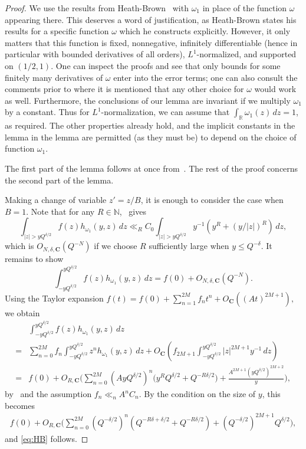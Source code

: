 \documentclass[letterpaper,11pt]{amsart}
\numberwithin{equation}{section}
\theoremstyle{definition}
\numberwithin{equation}{section}
\newcommand{\N}{\mathbb{N}}
\newcommand{\R}{\mathbb{R}}
\begin{document}
\begin{proof}
    We use the results from Heath-Brown~\cite[Section~4]{Heath-Brown96} with $\omega_1$ in place of the function $\omega$ appearing there. This deserves a word of justification, as Heath-Brown states his results for a specific function $\omega$ which he constructs explicitly. However, it only matters that this function is fixed, nonnegative, infinitely differentiable (hence in particular with bounded derivatives of all orders), $L^1$-normalized, and supported on $(1/2,1)$. One can inspect the proofs and see that only bounds for some finitely many derivatives of $\omega$ enter into the error terms; one can also consult the comments prior to \cite[Lemma 6]{Heath-Brown96} where it is mentioned that any other choice for $\omega$ would work as well. Furthermore, the conclusions of our lemma are invariant if we multiply $\omega_1$ by a constant. Thus for $L^1$-normalization, we can assume that \(\int_{\R}\omega_1(z)\,dz=1\), as required. The other properties already hold, and the implicit constants in the lemma in the lemma are permitted (as they must be) to depend on the choice of function $\omega_1$.

    The first part of the lemma follows at once from~\cite[Lemma 4]{Heath-Brown96}. The rest of the proof concerns the second part of the lemma.
    
	Making a change of variable \(z'=z/B\), it is enough to consider the case when \(B=1\).
	Note that for  any \(R\in\N\),~\cite[Lemma 5]{Heath-Brown96} gives
	\[
	\int_{|z|>yQ^{\delta/2}}
	f(z)h_{\omega_1}(y,z)\,dz
	\ll_R
	C_0
	\int_{|z|>yQ^{\delta/2}}
	y^{-1}(y^R+(y/|z|)^R)\,dz,
	\]
	which is \(O_{N,\delta,\boldsymbol{C}}(Q^{-N})\) if we choose \(R\) sufficiently large when $y\leq Q^{-\delta}$. It remains to show
	\begin{equation}\label{eq:HB}
\int_{-yQ^{\delta/2}}^{yQ^{\delta/2}}
	f(z)h_{\omega_1}(y,z)\,dz
	=	f(0)	+O_{N, \delta, \boldsymbol{C}} ( Q^{-N}).
	\end{equation}
	Using the Taylor expansion 
	\(
	f(t) = f(0)+\sum_{n=1}^{2M} f_n t^n+O_{\boldsymbol{C}}  (
	(At)^{2M+1}
	),
	\)
	we obtain
	\begin{align*}
&\int_{-yQ^{\delta/2}}^{yQ^{\delta/2}}
	f(z)h_{\omega_1}(y,z)\,dz
	\\=&
	\sum_{n=0}^{2M}
	f_n\int_{-yQ^{\delta/2}}^{yQ^{\delta/2}}
	z^n
	h_{\omega_1}(y,z)\,dz
	+O_{ \boldsymbol{C}}  \left( f_{2M+1}
	\int_{-yQ^{\delta/2}}^{yQ^{\delta/2}}
	|z|^{2M+1}
	y^{-1}\,dz\right)
	\\
	=
	{}&
	f(0)+O_{ R,\boldsymbol{C}} \bigg(
	\sum_{n=0}^{2M}
	(AyQ^{\delta/2})^n
	\big(
	y^RQ^{\delta/2}+
	Q^{-R\delta/2}
	\big)
	+\frac{A^{2M+1}
	(yQ^{\delta/2})^{2M+2}}{y}
	\bigg),
	\end{align*}
	by~\cite[Lemmas 6, 8]{Heath-Brown96} and the assumption $f_n\ll_n A^n C_n$. 
	By the condition on the size of $y$, this becomes
	\begin{align*}
	f(0)+	O_{ R,\boldsymbol{C}} \bigg(
	\sum_{n=0}^{2M}
	(Q^{-\delta/2})^n
	(Q^{-R\delta+\delta/2}+
	Q^{-R\delta/2})
	+
	(Q^{-\delta/2})^{2M+1}
	Q^{\delta/2}
	\bigg),
	\end{align*}
	and \eqref{eq:HB} follows.
\end{proof}
 
\end{document}

